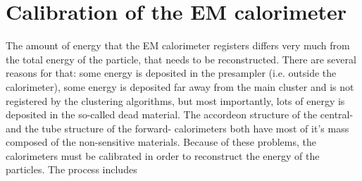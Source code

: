 \chapter{Calibration of the EM calorimeter}
\label{sec:Calibration}

The amount of energy that the EM calorimeter registers differs very much from the total energy of the particle, that needs to be reconstructed. There are several reasons for that: some energy is deposited in the presampler (i.e. outside the calorimeter), some energy is deposited far away from the main cluster and is not registered by the clustering algorithms, but most importantly, lots of energy is deposited in the so-called dead material. The accordeon structure of the central- and the tube structure of the forward- calorimeters both have most of it's mass composed of the non-sensitive materials. Because of these problems, the calorimeters must be calibrated in order to reconstruct the energy of the particles. The process includes
